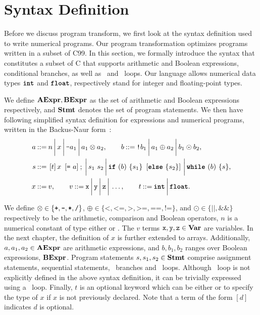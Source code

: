 \section{Syntax Definition}
\label{po:sec:syntax_definition}

Before we discuss program transform, we first look at the syntax definition
used to write numerical programs.  Our program transformation optimizes
programs written in a subset of C99.  In this section, we formally introduce
the syntax that constitutes a subset of C that supports arithmetic and Boolean
expressions, conditional branches, as well as \whilelit~and \forlit~loops.  Our
language allows numerical data types $\texttt{\textbf{int}}$ and $\texttt{\textbf{float}}$, respectively
stand for integer and floating-point types.

We define $\mathbf{AExpr}, \mathbf{BExpr}$ as the set of arithmetic and Boolean
expressions respectively, and $\mathbf{Stmt}$ denotes the set of program statements.
We then have following simplified syntax definition for expressions and
numerical programs, written in the Backus-Naur form~\cite{knuth64}:
\begin{equation}
    \begin{aligned}
        a \mathbin{::=} {} &
            n \,\bigg|\,
            x \,\bigg|\,
            \texttt{-}a_1 \,\bigg|\,
            a_1 \otimes a_2, \qquad
        b \mathbin{::=}
            \texttt{!}b_1 \,\bigg|\,
            a_1 \oplus a_2 \,\bigg|\,
            b_1 \odot b_2, \\
        s \mathbin{::=} {} &
            \left[ t \right] x~\left[ \texttt{=}~a \right] \mathbin{;} \,\bigg|\,
            s_1~s_2 \,\bigg|\,
            \texttt{\textbf{if}}~(b)~\{ s_1 \}~\left[\texttt{\textbf{else}}~\{ s_2 \}\right] \,\bigg|\,
            \texttt{\textbf{while}}~(b)~\{s\}, \\
        x \mathbin{::=} {} & v, \qquad
        v \mathbin{::=} \texttt{x} \,\bigg|\, \texttt{y} \,\bigg|\, \texttt{z} \,\bigg|\, \mathellipsis, \qquad
        t \mathbin{::=} \texttt{\textbf{int}} \,\bigg|\, \texttt{\textbf{float}}.
    \end{aligned}
    \label{po:eq:program_syntax}
\end{equation}

We define $\otimes \in \left\{ \texttt{+}, \texttt{-}, \texttt{*}, \texttt{/}
\right\}$, $\oplus \in \{ \texttt{<}, \texttt{<=}, \texttt{>}, \texttt{>=},
\texttt{==}, \texttt{!=} \}$, and $\odot \in \{ \texttt{||}, \texttt{\&\&}
\}$ respectively to be the arithmetic, comparison and Boolean operators,
$n$ is a numerical constant of type either \inttype{} or \floattype.  The
$v$ terms $\texttt{x}, \texttt{y}, \texttt{z} \in \mathbf{Var}$ are variables.  In the next
chapter, the definition of $x$ is further extended to arrays.  Additionally,
$a, a_1, a_2 \in \mathbf{AExpr}$ are arithmetic expressions, and $b, b_1, b_2$
ranges over Boolean expressions, $\mathbf{BExpr}$.  Program statements $s, s_1,
s_2 \in \mathbf{Stmt}$ comprise assignment statements, sequential statements,
\iflit~branches and \whilelit~loops.  Although \forlit~loop is not explicitly
defined in the above syntax definition, it can be trivially expressed using
a \whilelit~loop.  Finally, $t$ is an optional keyword which can be either
\inttype{} or \floattype{} to specify the type of $x$ if $x$ is not previously
declared.  Note that a term of the form $[d]$ indicates $d$ is optional.

